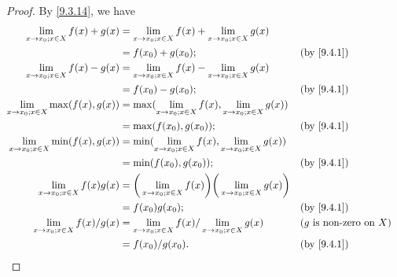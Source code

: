 \begin{proof}
  By \cref{9.3.14}, we have
  \begin{align*}
    \lim_{x \to x_0 ; x \in X} f(x) + g(x)      & = \lim_{x \to x_0 ; x \in X} f(x) + \lim_{x \to x_0 ; x \in X} g(x)                                                               \\
                                                & = f(x_0) + g(x_0);                                                                       &  & \by{9.4.1}                          \\
    \lim_{x \to x_0 ; x \in X} f(x) - g(x)      & = \lim_{x \to x_0 ; x \in X} f(x) - \lim_{x \to x_0 ; x \in X} g(x)                                                               \\
                                                & = f(x_0) - g(x_0);                                                                       &  & \by{9.4.1}                          \\
    \lim_{x \to x_0 ; x \in X} \max(f(x), g(x)) & = \max(\lim_{x \to x_0 ; x \in X} f(x), \lim_{x \to x_0 ; x \in X} g(x))                                                          \\
                                                & = \max(f(x_0), g(x_0));                                                                  &  & \by{9.4.1}                          \\
    \lim_{x \to x_0 ; x \in X} \min(f(x), g(x)) & = \min(\lim_{x \to x_0 ; x \in X} f(x), \lim_{x \to x_0 ; x \in X} g(x))                                                          \\
                                                & = \min(f(x_0), g(x_0));                                                                  &  & \by{9.4.1}                          \\
    \lim_{x \to x_0 ; x \in X} f(x) g(x)        & = \bigg(\lim_{x \to x_0 ; x \in X} f(x)\bigg)\bigg(\lim_{x \to x_0 ; x \in X} g(x)\bigg)                                          \\
                                                & = f(x_0) g(x_0);                                                                         &  & \by{9.4.1}                          \\
    \lim_{x \to x_0 ; x \in X} f(x) / g(x)      & = \lim_{x \to x_0 ; x \in X} f(x) / \lim_{x \to x_0 ; x \in X} g(x)                      &  & \text{(\(g\) is non-zero on \(X\))} \\
                                                & = f(x_0) / g(x_0).                                                                       &  & \by{9.4.1}                          \\
  \end{align*}
\end{proof}

